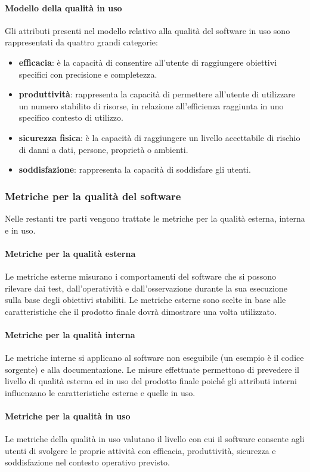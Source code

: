 			\paragraph{Modello della qualità in uso}
			Gli attributi presenti nel modello relativo alla qualità del software in uso sono rappresentati da quattro grandi categorie:
			\begin{itemize}
				\item \textbf{efficacia}: è la capacità di consentire all'utente di raggiungere obiettivi specifici con precisione e completezza.
				\item \textbf{produttività}: rappresenta la capacità di permettere all'utente di utilizzare un numero stabilito di risorse, in relazione all'efficienza raggiunta in uno specifico contesto di utilizzo.
				\item \textbf{sicurezza fisica}: è la capacità di raggiungere un livello accettabile di rischio di danni a dati, persone, proprietà o ambienti.
				\item \textbf{soddisfazione}: rappresenta la capacità di soddisfare gli utenti.
			\end{itemize}
		\subsubsection{Metriche per la qualità del software}
		Nelle restanti tre parti vengono trattate le metriche per la qualità esterna, interna e in uso.
			\paragraph{Metriche per la qualità esterna}
			Le metriche esterne misurano i comportamenti del software che si possono rilevare dai test, dall'operatività e dall'osservazione durante la sua esecuzione sulla base degli obiettivi stabiliti. Le metriche esterne sono scelte in base alle caratteristiche che il prodotto finale dovrà dimostrare una volta utilizzato.
			\paragraph{Metriche per la qualità interna}
			Le metriche interne si applicano al software non eseguibile (un esempio è il codice sorgente) e alla documentazione. Le misure effettuate permettono di prevedere il livello di qualità esterna ed in uso del prodotto finale poiché gli attributi interni influenzano le caratteristiche esterne e quelle in uso.
			\paragraph{Metriche per la qualità in uso}
			Le metriche della qualità in uso valutano il livello con cui il software consente agli utenti di svolgere le proprie attività con efficacia, produttività, sicurezza e soddisfazione nel contesto operativo previsto.
	

